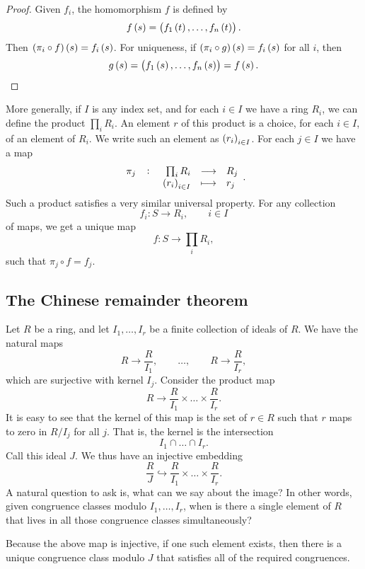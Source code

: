 \begin{proof}
Given $ f_i $, the homomorphism $ f $ is defined by
$$ f\br{s} = \br{f_1\br{t}, \dots, f_n\br{t}}. $$
Then $ \br{\pi_i \circ f}\br{s} = f_i\br{s} $. For uniqueness, if $ \br{\pi_i \circ g}\br{s} = f_i\br{s} $ for all $ i $, then
$$ g\br{s} = \br{f_1\br{s}, \dots, f_n\br{s}} = f\br{s}. $$
\end{proof}

More generally, if $ I $ is any index set, and for each $ i \in I $ we have a ring $ R_i $, we can define the product $ \prod_i R_i $. An element $ r $ of this product is a choice, for each $ i \in I $, of an element of $ R_i $. We write such an element as $ \br{r_i}_{i \in I} $. For each $ j \in I $ we have a map
$$ \function[\pi_j]{\prod_i R_i}{R_j}{\br{r_i}_{i \in I}}{r_j}. $$
Such a product satisfies a very similar universal property. For any collection
$$ f_i : S \to R_i, \qquad i \in I $$
of maps, we get a unique map
$$ f : S \to \prod_i R_i, $$
such that $ \pi_j \circ f = f_j $.

\pagebreak

\subsection{The Chinese remainder theorem}

Let $ R $ be a ring, and let $ I_1, \dots, I_r $ be a finite collection of ideals of $ R $. We have the natural maps
$$ R \to \dfrac{R}{I_1}, \qquad \dots, \qquad R \to \dfrac{R}{I_r}, $$
which are surjective with kernel $ I_j $. Consider the product map
$$ R \to \dfrac{R}{I_1} \times \dots \times \dfrac{R}{I_r}. $$
It is easy to see that the kernel of this map is the set of $ r \in R $ such that $ r $ maps to zero in $ R / I_j $ for all $ j $. That is, the kernel is the intersection
$$ I_1 \cap \dots \cap I_r. $$
Call this ideal $ J $. We thus have an injective embedding
$$ \dfrac{R}{J} \hookrightarrow \dfrac{R}{I_1} \times \dots \times \dfrac{R}{I_r}. $$
A natural question to ask is, what can we say about the image? In other words, given congruence classes modulo $ I_1, \dots, I_r $, when is there a single element of $ R $ that lives in all those congruence classes simultaneously?

\begin{note*}
Because the above map is injective, if one such element exists, then there is a unique congruence class modulo $ J $ that satisfies all of the required congruences.
\end{note*}

